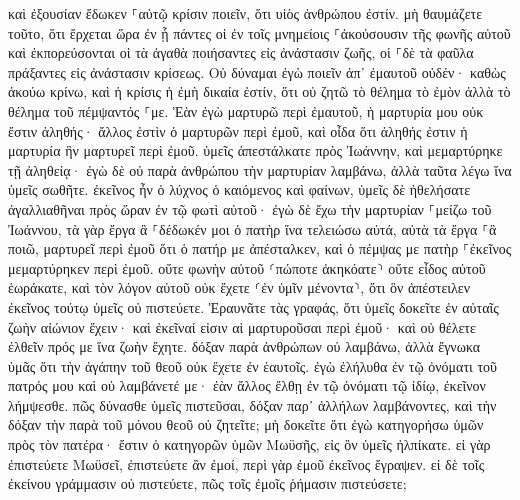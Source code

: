 \documentclass[twoside, 9pt]{extreport}
\begin{document}
καὶ ἐξουσίαν ἔδωκεν ⸀αὐτῷ κρίσιν ποιεῖν, ὅτι υἱὸς ἀνθρώπου ἐστίν. 
μὴ θαυμάζετε τοῦτο, ὅτι ἔρχεται ὥρα ἐν ᾗ πάντες οἱ ἐν τοῖς μνημείοις ⸀ἀκούσουσιν τῆς φωνῆς αὐτοῦ 
καὶ ἐκπορεύσονται οἱ τὰ ἀγαθὰ ποιήσαντες εἰς ἀνάστασιν ζωῆς, οἱ ⸀δὲ τὰ φαῦλα πράξαντες εἰς ἀνάστασιν κρίσεως. 
Οὐ δύναμαι ἐγὼ ποιεῖν ἀπ᾽ ἐμαυτοῦ οὐδέν· καθὼς ἀκούω κρίνω, καὶ ἡ κρίσις ἡ ἐμὴ δικαία ἐστίν, ὅτι οὐ ζητῶ τὸ θέλημα τὸ ἐμὸν ἀλλὰ τὸ θέλημα τοῦ πέμψαντός ⸀με. 
Ἐὰν ἐγὼ μαρτυρῶ περὶ ἐμαυτοῦ, ἡ μαρτυρία μου οὐκ ἔστιν ἀληθής· 
ἄλλος ἐστὶν ὁ μαρτυρῶν περὶ ἐμοῦ, καὶ οἶδα ὅτι ἀληθής ἐστιν ἡ μαρτυρία ἣν μαρτυρεῖ περὶ ἐμοῦ. 
ὑμεῖς ἀπεστάλκατε πρὸς Ἰωάννην, καὶ μεμαρτύρηκε τῇ ἀληθείᾳ· 
ἐγὼ δὲ οὐ παρὰ ἀνθρώπου τὴν μαρτυρίαν λαμβάνω, ἀλλὰ ταῦτα λέγω ἵνα ὑμεῖς σωθῆτε. 
ἐκεῖνος ἦν ὁ λύχνος ὁ καιόμενος καὶ φαίνων, ὑμεῖς δὲ ἠθελήσατε ἀγαλλιαθῆναι πρὸς ὥραν ἐν τῷ φωτὶ αὐτοῦ· 
ἐγὼ δὲ ἔχω τὴν μαρτυρίαν ⸀μείζω τοῦ Ἰωάννου, τὰ γὰρ ἔργα ἃ ⸀δέδωκέν μοι ὁ πατὴρ ἵνα τελειώσω αὐτά, αὐτὰ τὰ ἔργα ⸀ἃ ποιῶ, μαρτυρεῖ περὶ ἐμοῦ ὅτι ὁ πατήρ με ἀπέσταλκεν, 
καὶ ὁ πέμψας με πατὴρ ⸀ἐκεῖνος μεμαρτύρηκεν περὶ ἐμοῦ. οὔτε φωνὴν αὐτοῦ ⸂πώποτε ἀκηκόατε⸃ οὔτε εἶδος αὐτοῦ ἑωράκατε, 
καὶ τὸν λόγον αὐτοῦ οὐκ ἔχετε ⸂ἐν ὑμῖν μένοντα⸃, ὅτι ὃν ἀπέστειλεν ἐκεῖνος τούτῳ ὑμεῖς οὐ πιστεύετε. 
Ἐραυνᾶτε τὰς γραφάς, ὅτι ὑμεῖς δοκεῖτε ἐν αὐταῖς ζωὴν αἰώνιον ἔχειν· καὶ ἐκεῖναί εἰσιν αἱ μαρτυροῦσαι περὶ ἐμοῦ· 
καὶ οὐ θέλετε ἐλθεῖν πρός με ἵνα ζωὴν ἔχητε. 
δόξαν παρὰ ἀνθρώπων οὐ λαμβάνω, 
ἀλλὰ ἔγνωκα ὑμᾶς ὅτι τὴν ἀγάπην τοῦ θεοῦ οὐκ ἔχετε ἐν ἑαυτοῖς. 
ἐγὼ ἐλήλυθα ἐν τῷ ὀνόματι τοῦ πατρός μου καὶ οὐ λαμβάνετέ με· ἐὰν ἄλλος ἔλθῃ ἐν τῷ ὀνόματι τῷ ἰδίῳ, ἐκεῖνον λήμψεσθε. 
πῶς δύνασθε ὑμεῖς πιστεῦσαι, δόξαν παρ᾽ ἀλλήλων λαμβάνοντες, καὶ τὴν δόξαν τὴν παρὰ τοῦ μόνου θεοῦ οὐ ζητεῖτε; 
μὴ δοκεῖτε ὅτι ἐγὼ κατηγορήσω ὑμῶν πρὸς τὸν πατέρα· ἔστιν ὁ κατηγορῶν ὑμῶν Μωϋσῆς, εἰς ὃν ὑμεῖς ἠλπίκατε. 
εἰ γὰρ ἐπιστεύετε Μωϋσεῖ, ἐπιστεύετε ἂν ἐμοί, περὶ γὰρ ἐμοῦ ἐκεῖνος ἔγραψεν. 
εἰ δὲ τοῖς ἐκείνου γράμμασιν οὐ πιστεύετε, πῶς τοῖς ἐμοῖς ῥήμασιν πιστεύσετε; 
\end{document}
